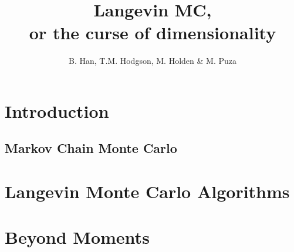 \documentclass[a4paper]{article}
\title{Langevin MC, \\
  \large or the curse of dimensionality}
\author{B. Han, T.M. Hodgson, M. Holden \& M. Puza}
\theoremstyle{definition}
\begin{document}
	\maketitle
	\tableofcontents
	\section{Introduction}
	
	\subsection{Markov Chain Monte Carlo}
	
	\section{Langevin Monte Carlo Algorithms}
		
	
	\section{Beyond Moments}
	
	

	
	
		
\end{document}
